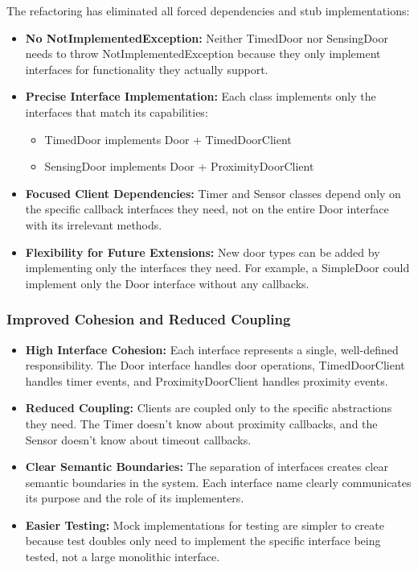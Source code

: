 The refactoring has eliminated all forced dependencies and stub implementations:

\begin{itemize}
    \item \textbf{No NotImplementedException:} Neither TimedDoor nor SensingDoor needs to throw NotImplementedException because they only implement interfaces for functionality they actually support.
    
    \item \textbf{Precise Interface Implementation:} Each class implements only the interfaces that match its capabilities:
    \begin{itemize}
        \item TimedDoor implements Door + TimedDoorClient
        \item SensingDoor implements Door + ProximityDoorClient
    \end{itemize}
    
    \item \textbf{Focused Client Dependencies:} Timer and Sensor classes depend only on the specific callback interfaces they need, not on the entire Door interface with its irrelevant methods.
    
    \item \textbf{Flexibility for Future Extensions:} New door types can be added by implementing only the interfaces they need. For example, a SimpleDoor could implement only the Door interface without any callbacks.
\end{itemize}

\subsubsection{Improved Cohesion and Reduced Coupling}

\begin{itemize}
    \item \textbf{High Interface Cohesion:} Each interface represents a single, well-defined responsibility. The Door interface handles door operations, TimedDoorClient handles timer events, and ProximityDoorClient handles proximity events.
    
    \item \textbf{Reduced Coupling:} Clients are coupled only to the specific abstractions they need. The Timer doesn't know about proximity callbacks, and the Sensor doesn't know about timeout callbacks.
    
    \item \textbf{Clear Semantic Boundaries:} The separation of interfaces creates clear semantic boundaries in the system. Each interface name clearly communicates its purpose and the role of its implementers.
    
    \item \textbf{Easier Testing:} Mock implementations for testing are simpler to create because test doubles only need to implement the specific interface being tested, not a large monolithic interface.
\end{itemize}

